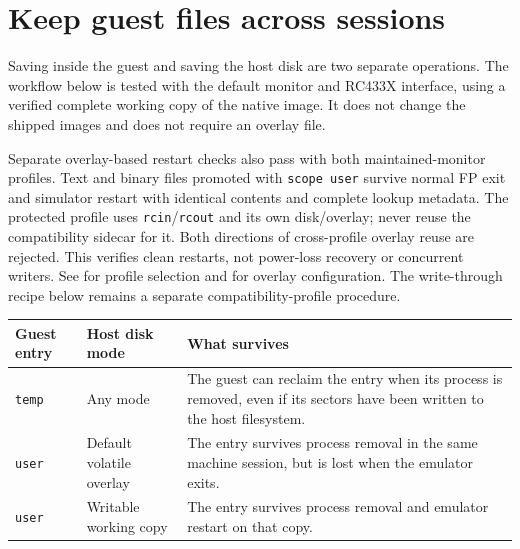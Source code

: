 \chapter{Keep guest files across sessions}\label{keep-guest-files-across-sessions}

Saving inside the guest and saving the host disk are two separate operations. The workflow below is tested with the default monitor and RC433X interface, using a verified complete working copy of the native image. It does not change the shipped images and does not require an overlay file.

Separate overlay-based restart checks also pass with both maintained-monitor
profiles. Text and binary files promoted with \texttt{scope user} survive normal
FP exit and simulator restart with identical contents and complete lookup
metadata. The protected profile uses \texttt{rcin}/\texttt{rcout} and its own
disk/overlay; never reuse the compatibility sidecar for it. Both directions of
cross-profile overlay reuse are rejected. This verifies clean restarts, not
power-loss recovery or concurrent writers. See
for profile selection and
for overlay configuration. The write-through recipe below remains a separate
compatibility-profile procedure.

\begin{longtable}[]{@{}
  >{\raggedright\arraybackslash}p{}
  >{\raggedright\arraybackslash}p{}
  >{\raggedright\arraybackslash}p{}@{}}
\toprule\noalign{}
\begin{minipage}[b]{\linewidth}\raggedright
Guest entry
\end{minipage} & \begin{minipage}[b]{\linewidth}\raggedright
Host disk mode
\end{minipage} & \begin{minipage}[b]{\linewidth}\raggedright
What survives
\end{minipage} \\
\midrule\noalign{}
\endhead
\bottomrule\noalign{}
\endlastfoot
\passthrough{\lstinline!temp!} & Any mode & The guest can reclaim the entry when its process is removed, even if its sectors have been written to the host filesystem. \\
\passthrough{\lstinline!user!} & Default volatile overlay & The entry survives process removal in the same machine session, but is lost when the emulator exits. \\
\passthrough{\lstinline!user!} & Writable working copy & The entry survives process removal and emulator restart on that copy. \\
\end{longtable}

